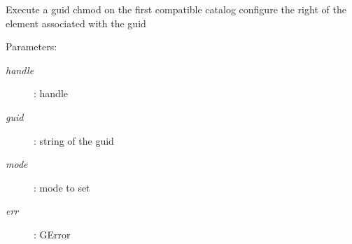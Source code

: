 Execute a guid chmod on the first compatible catalog configure the right of the element associated with the guid \begin{Desc}
\item[Parameters:]
\begin{description}
\item[{\em handle}]: handle \item[{\em guid}]: string of the guid \item[{\em mode}]: mode to set \item[{\em err}]: GError \end{description}
\end{Desc}
